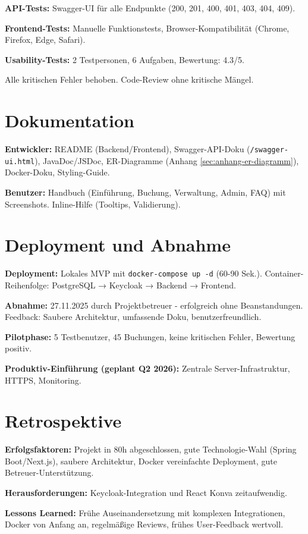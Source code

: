 \documentclass[11pt,a4paper]{report}
\begin{document}
\textbf{API-Tests:} Swagger-UI für alle Endpunkte (200, 201, 400, 401, 403, 404, 409).

\textbf{Frontend-Tests:} Manuelle Funktionstests, Browser-Kompatibilität (Chrome, Firefox, Edge, Safari).

\textbf{Usability-Tests:} 2 Testpersonen, 6 Aufgaben, Bewertung: 4.3/5.

Alle kritischen Fehler behoben. Code-Review ohne kritische Mängel.

\section{Dokumentation}

\textbf{Entwickler:} README (Backend/Frontend), Swagger-API-Doku (\texttt{/swagger-ui.html}), JavaDoc/JSDoc, ER-Diagramme (Anhang \ref{sec:anhang-er-diagramm}), Docker-Doku, Styling-Guide.

\textbf{Benutzer:} Handbuch (Einführung, Buchung, Verwaltung, Admin, FAQ) mit Screenshots. Inline-Hilfe (Tooltips, Validierung).

\section{Deployment und Abnahme}

\textbf{Deployment:} Lokales MVP mit \texttt{docker-compose up -d} (60-90 Sek.). Container-Reihenfolge: PostgreSQL → Keycloak → Backend → Frontend.

\textbf{Abnahme:} 27.11.2025 durch Projektbetreuer - erfolgreich ohne Beanstandungen. Feedback: Saubere Architektur, umfassende Doku, benutzerfreundlich.

\textbf{Pilotphase:} 5 Testbenutzer, 45 Buchungen, keine kritischen Fehler, Bewertung positiv.

\textbf{Produktiv-Einführung (geplant Q2 2026):} Zentrale Server-Infrastruktur, HTTPS, Monitoring.

\section{Retrospektive}

\textbf{Erfolgsfaktoren:} Projekt in 80h abgeschlossen, gute Technologie-Wahl (Spring Boot/Next.js), saubere Architektur, Docker vereinfachte Deployment, gute Betreuer-Unterstützung.

\textbf{Herausforderungen:} Keycloak-Integration und React Konva zeitaufwendig.

\textbf{Lessons Learned:} Frühe Auseinandersetzung mit komplexen Integrationen, Docker von Anfang an, regelmäßige Reviews, frühes User-Feedback wertvoll.
\end{document}

